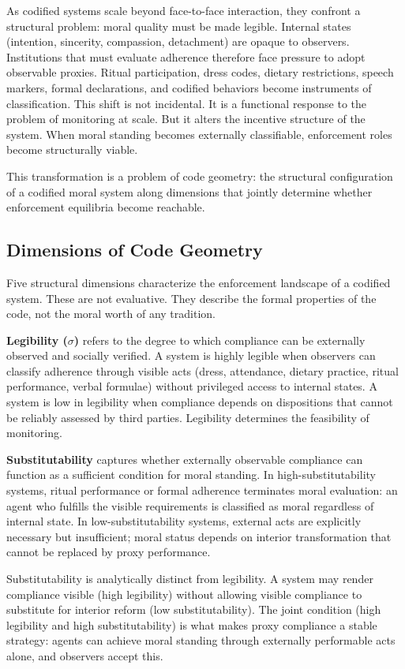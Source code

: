 \documentclass[12pt]{article}
\begin{document}
As codified systems scale beyond face-to-face interaction, they confront a structural problem: moral quality must be made legible. Internal states (intention, sincerity, compassion, detachment) are opaque to observers. Institutions that must evaluate adherence therefore face pressure to adopt observable proxies. Ritual participation, dress codes, dietary restrictions, speech markers, formal declarations, and codified behaviors become instruments of classification. This shift is not incidental. It is a functional response to the problem of monitoring at scale. But it alters the incentive structure of the system. When moral standing becomes externally classifiable, enforcement roles become structurally viable.

This transformation is a problem of code geometry: the structural configuration of a codified moral system along dimensions that jointly determine whether enforcement equilibria become reachable.

\subsection{Dimensions of Code Geometry}

Five structural dimensions characterize the enforcement landscape of a codified system. These are not evaluative. They describe the formal properties of the code, not the moral worth of any tradition.

\textbf{Legibility ($\sigma$)} refers to the degree to which compliance can be externally observed and socially verified. A system is highly legible when observers can classify adherence through visible acts (dress, attendance, dietary practice, ritual performance, verbal formulae) without privileged access to internal states. A system is low in legibility when compliance depends on dispositions that cannot be reliably assessed by third parties. Legibility determines the feasibility of monitoring.

\textbf{Substitutability} captures whether externally observable compliance can function as a sufficient condition for moral standing. In high-substitutability systems, ritual performance or formal adherence terminates moral evaluation: an agent who fulfills the visible requirements is classified as moral regardless of internal state. In low-substitutability systems, external acts are explicitly necessary but insufficient; moral status depends on interior transformation that cannot be replaced by proxy performance.

Substitutability is analytically distinct from legibility. A system may render compliance visible (high legibility) without allowing visible compliance to substitute for interior reform (low substitutability). The joint condition (high legibility and high substitutability) is what makes proxy compliance a stable strategy: agents can achieve moral standing through externally performable acts alone, and observers accept this.
\end{document}
